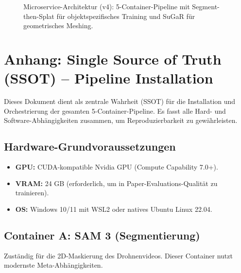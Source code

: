 \documentclass[12pt,a4paper]{article}
\begin{document}
\begin{figure}[H]
{
    }
    \caption{Microservice-Architektur (v4): 5-Container-Pipeline mit Segment-then-Splat für objektspezifisches Training und SuGaR für geometrisches Meshing.}
\end{figure}

\section{Anhang: Single Source of Truth (SSOT) -- Pipeline Installation}
Dieses Dokument dient als zentrale Wahrheit (SSOT) für die Installation und Orchestrierung der gesamten 5-Container-Pipeline. Es fasst alle Hard- und Software-Abhängigkeiten zusammen, um Reproduzierbarkeit zu gewährleisten.

\subsection*{Hardware-Grundvoraussetzungen}
\begin{itemize}[noitemsep]
    \item \textbf{GPU:} CUDA-kompatible Nvidia GPU (Compute Capability 7.0+).
    \item \textbf{VRAM:} 24 GB (erforderlich, um in Paper-Evaluations-Qualität zu trainieren).
    \item \textbf{OS:} Windows 10/11 mit WSL2 oder natives Ubuntu Linux 22.04.
\end{itemize}

\subsection*{Container A: SAM 3 (Segmentierung)}
Zuständig für die 2D-Maskierung des Drohnenvideos. Dieser Container nutzt modernste Meta-Abhängigkeiten.
\end{document}

